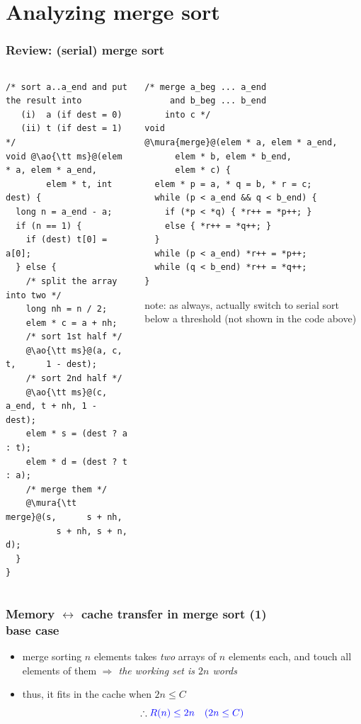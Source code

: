\documentclass[12pt,dvipdfmx]{beamer}
\newcommand{\mura}[1]{{\color{purple}#1}}
\newcommand{\ao}[1]{{\color{blue}#1}}
\newcommand{\aka}[1]{{\color{red}#1}}
\begin{document}
\section{Analyzing merge sort}
\begin{frame}[fragile]
\frametitle{Review: (serial) merge sort}
\begin{columns}
\begin{column}{0.45\textwidth}
\begin{lstlisting}
/* sort a..a_end and put the result into
   (i)  a (if dest = 0)
   (ii) t (if dest = 1) */
void @\ao{\tt ms}@(elem * a, elem * a_end, 
        elem * t, int dest) {
  long n = a_end - a;
  if (n == 1) {
    if (dest) t[0] = a[0];
  } else {
    /* split the array into two */
    long nh = n / 2;
    elem * c = a + nh;
    /* sort 1st half */
    @\ao{\tt ms}@(a, c,     t,      1 - dest);
    /* sort 2nd half */
    @\ao{\tt ms}@(c, a_end, t + nh, 1 - dest);
    elem * s = (dest ? a : t);
    elem * d = (dest ? t : a);
    /* merge them */
    @\mura{\tt merge}@(s,      s + nh, 
          s + nh, s + n, d);
  }
}
\end{lstlisting}
\end{column}

\begin{column}{0.43\textwidth}
\begin{lstlisting}
/* merge a_beg ... a_end 
     and b_beg ... b_end 
    into c */
void 
@\mura{merge}@(elem * a, elem * a_end, 
      elem * b, elem * b_end, 
      elem * c) {
  elem * p = a, * q = b, * r = c;
  while (p < a_end && q < b_end) {
    if (*p < *q) { *r++ = *p++; }
    else { *r++ = *q++; }
  }
  while (p < a_end) *r++ = *p++;
  while (q < b_end) *r++ = *q++;
}
\end{lstlisting}

\aka{note:} as always, actually switch to serial sort below a threshold
  (not shown in the code above)
\end{column}
\end{columns}
\end{frame}

\begin{frame}[fragile]
\frametitle{Memory $\leftrightarrow$ cache transfer in merge sort (1)
\\ base case}
\begin{itemize}
\item merge sorting $n$ elements takes \ao{\em two}
  arrays of $n$ elements each, and touch all elements of them
  \ao{\em $\Rightarrow$ the working set is $2n$ words}

\item thus, it fits in the cache when $2n \leq C$
\[ \therefore \ao{R(n) \leq 2n \quad (2n \leq C)} \]
\end{itemize}
\end{frame}
\end{document}

